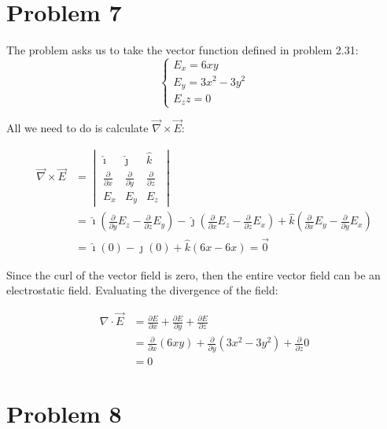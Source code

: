 \documentclass{article}
\theoremstyle{definition}
\numberwithin{equation}{section}
\numberwithin{definition}{section}
\begin{document}
    \section{Problem 7}

    The problem asks us to take the vector function defined in problem 2.31:
    \[ \begin{cases}
        E_x = 6xy\\
        E_y = 3x^2 -3y^2\\
        E_z z= 0
    \end{cases}\]

    All we need to do is calculate $\vec{\nabla}\times \vec{E}$:

    \begin{align*}
        \vec{\nabla}\times \vec{E} &= \begin{vmatrix}
            \hat \imath & \hat \jmath & \hat k \\
            \frac{\partial}{\partial x} & \frac{\partial}{\partial y} & \frac{\partial}{\partial z} \\
            E_x & E_y & E_z 
            \end{vmatrix}\\
            &= \hat \imath\left(\frac{\partial}{\partial y} E_z - \frac{\partial }{\partial z} E_y\right) - \hat \jmath \left(\frac{\partial}{\partial x} E_z - \frac{\partial}{\partial z} E_x\right) + \hat k \left(\frac{\partial}{\partial x}E_y - \frac{\partial}{\partial y} E_x \right)\\
            &= \hat\imath (0) - \hat\jmath (0) + \hat k (6x - 6x) = \vec{0} 
    \end{align*}

    Since the curl of the vector field is zero, then the entire vector field can be an electrostatic field. Evaluating the divergence of the field:

    \begin{align*}
        \nabla \cdot \vec{E} &= \frac{\partial E}{\partial x} + \frac{\partial E}{\partial y} + \frac{\partial E}{\partial z}\\
        &= \frac{\partial}{\partial x} (6xy) + \frac{\partial}{\partial y} (3x^2 - 3y^2) + \frac{\partial}{\partial z} 0\\
        &= 0
    \end{align*}

    \section{Problem 8} 
\end{document}
